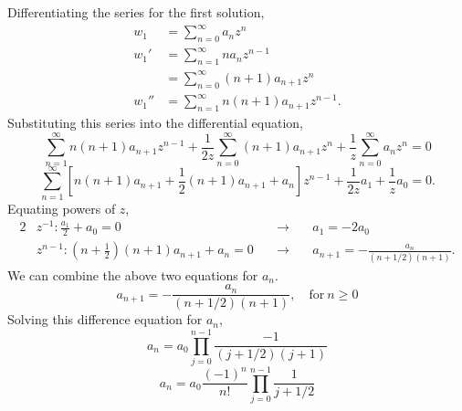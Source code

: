 {\begin{Solution}
  Differentiating the series for the first solution,
  \begin{align*}
    w_1     &= \sum_{n=0}^\infty a_n z^n \\
    w_1'    &= \sum_{n=1}^\infty n a_n z^{n-1} \\
    &= \sum_{n=0}^\infty (n+1) a_{n+1} z^n \\
    w_1''   &= \sum_{n=1}^\infty n (n+1) a_{n+1} z^{n-1}.
  \end{align*}
  Substituting this series into the differential equation,
  \[
  \sum_{n=1}^\infty n (n+1) a_{n+1} z^{n-1}
  + \frac{1}{2 z} \sum_{n=0}^\infty (n+1) a_{n+1} z^n
  + \frac{1}{z} \sum_{n=0}^\infty a_n z^n  = 0
  \]
  \[
  \sum_{n=1}^\infty \left[ n(n+1) a_{n+1} + \frac{1}{2} (n+1) a_{n+1} + a_n \right]
  z^{n-1} + \frac{1}{2 z} a_1 + \frac{1}{z} a_0 = 0.
  \]
  Equating powers of $z$,
  \begin{alignat*}{2}
    &z^{-1}: \frac{a_1}{2} + a_0 = 0 \quad &\to \quad
    &a_1 = - 2 a_0 \\
    &z^{n-1}: \left(n+\frac{1}{2}\right) (n+1) a_{n+1} + a_n = 0 \quad &\to \quad
    &a_{n+1} = - \frac{a_n}{(n+1/2)(n+1)}.
  \end{alignat*}
  We can combine the above two equations for $a_n$.
  \[
  a_{n+1} = - \frac{a_n}{(n+1/2)(n+1)}, \quad \mathrm{for}\ n \geq 0
  \]
  Solving this difference equation for $a_n$,
  \[
  a_n = a_0 \prod_{j=0}^{n-1} \frac{-1}{(j+1/2)(j+1)}
  \]
  \[
  \boxed{
    a_n = a_0 \frac{(-1)^n}{n!} \prod_{j=0}^{n-1} \frac{1}{j+1/2}
    }
  \]


\end{Solution}}
